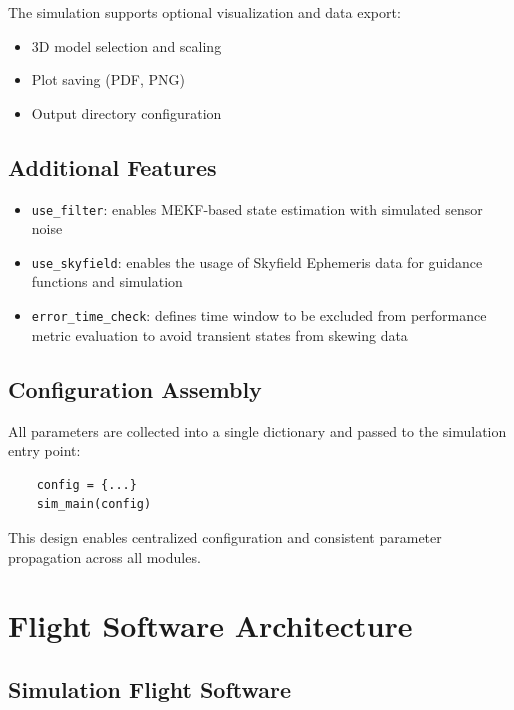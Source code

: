 The simulation supports optional visualization and data export:

\begin{itemize}
	\item 3D model selection and scaling
	\item Plot saving (PDF, PNG)
	\item Output directory configuration
\end{itemize}

\subsection{Additional Features}

\begin{itemize}
	\item \texttt{use\_filter}: enables MEKF-based state estimation with simulated sensor noise
	\item \texttt{use\_skyfield}: enables the usage of Skyfield Ephemeris data for guidance functions and simulation
	\item \texttt{error\_time\_check}: defines time window to be excluded from performance metric evaluation to avoid transient states from skewing data
\end{itemize}

\subsection{Configuration Assembly}

All parameters are collected into a single dictionary and passed to the simulation entry point:

\begin{verbatim}
	config = {...}
	sim_main(config)
\end{verbatim}

This design enables centralized configuration and consistent parameter propagation across all modules.


\section{Flight Software Architecture}

\subsection{Simulation Flight Software}

